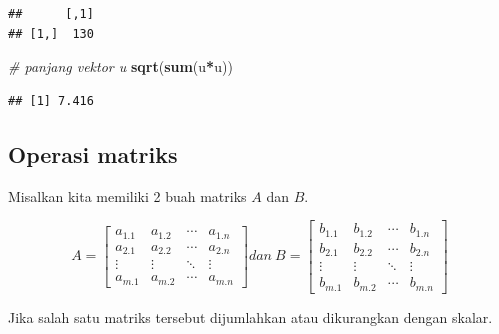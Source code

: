 \documentclass[
]{book}
\newenvironment{Shaded}{\begin{snugshade}}{\end{snugshade}}
\newcommand{\CommentTok}[1]{\textcolor[rgb]{0.56,0.35,0.01}{\textit{#1}}}
\newcommand{\FunctionTok}[1]{\textcolor[rgb]{0.13,0.29,0.53}{\textbf{#1}}}
\newcommand{\NormalTok}[1]{#1}
\newcommand{\SpecialCharTok}[1]{\textcolor[rgb]{0.81,0.36,0.00}{\textbf{#1}}}
\theoremstyle{definition}
\theoremstyle{definition}
\theoremstyle{definition}
\theoremstyle{definition}
\theoremstyle{remark}
\begin{document}
\begin{verbatim}
##      [,1]
## [1,]  130
\end{verbatim}

\begin{Shaded}
\begin{Highlighting}[]
\CommentTok{\# panjang vektor u}
\FunctionTok{sqrt}\NormalTok{(}\FunctionTok{sum}\NormalTok{(u}\SpecialCharTok{*}\NormalTok{u))}
\end{Highlighting}
\end{Shaded}

\begin{verbatim}
## [1] 7.416
\end{verbatim}

\hypertarget{operasimatrik}{%
\subsection{Operasi matriks}\label{operasimatrik}}

Misalkan kita memiliki 2 buah matriks \(A\) dan \(B\).

\begin{equation}
A = \begin{bmatrix}
       a_{1.1} & a_{1.2} &\cdots& a_{1.n}           \\[0.3em]
       a_{2.1} & a_{2.2} &\cdots& a_{2.n}           \\[0.3em]
       \vdots  & \vdots  &\ddots& \vdots            \\[0.3em]
       a_{m.1} & a_{m.2} &\cdots& a_{m.n}
     \end{bmatrix}
dan\ B = \begin{bmatrix}
      b_{1.1} & b_{1.2} &\cdots& b_{1.n}           \\[0.3em]
      b_{2.1} & b_{2.2} &\cdots& b_{2.n}           \\[0.3em]
      \vdots  & \vdots  &\ddots& \vdots            \\[0.3em]
      b_{m.1} & b_{m.2} &\cdots& b_{m.n}
     \end{bmatrix}
  \label{eq:matrikuv}
\end{equation}

Jika salah satu matriks tersebut dijumlahkan atau dikurangkan dengan skalar.
\end{document}
